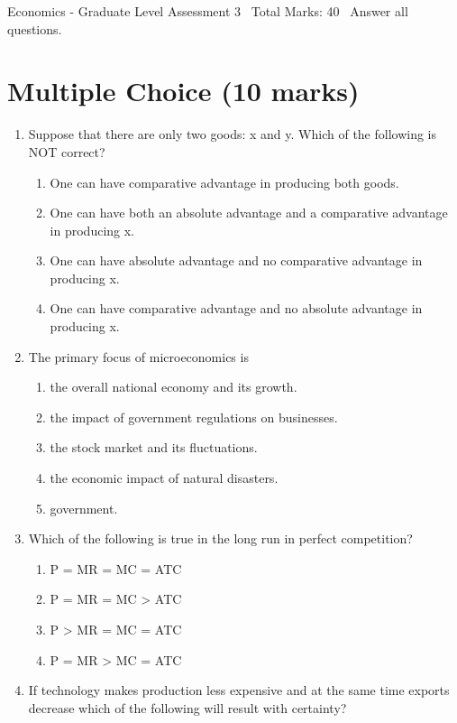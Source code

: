 \documentclass[12pt]{article}
\begin{document}
\begin{center}
Economics - Graduate Level Assessment 3 \
Total Marks: 40 \
Answer all questions.
\end{center}

\section*{Multiple Choice (10 marks)}
\begin{enumerate}[label=\arabic*.]
\item Suppose that there are only two goods: x and y. Which of the following is NOT correct?
\begin{enumerate}[label=(\alph*)]
    \item One can have comparative advantage in producing both goods.
    \item One can have both an absolute advantage and a comparative advantage in producing x.
    \item One can have absolute advantage and no comparative advantage in producing x.
    \item One can have comparative advantage and no absolute advantage in producing x.
\end{enumerate}
\item The primary focus of microeconomics is
\begin{enumerate}[label=(\alph*)]
    \item the overall national economy and its growth.
    \item the impact of government regulations on businesses.
    \item the stock market and its fluctuations.
    \item the economic impact of natural disasters.
    \item government.
\end{enumerate}
\item Which of the following is true in the long run in perfect competition?
\begin{enumerate}[label=(\alph*)]
    \item P = MR = MC = ATC
    \item P = MR = MC \textgreater{} ATC
    \item P \textgreater{} MR = MC = ATC
    \item P = MR \textgreater{} MC = ATC
\end{enumerate}
\item If technology makes production less expensive and at the same time exports decrease which of the following will result with certainty?

\end{enumerate}
\end{document}
